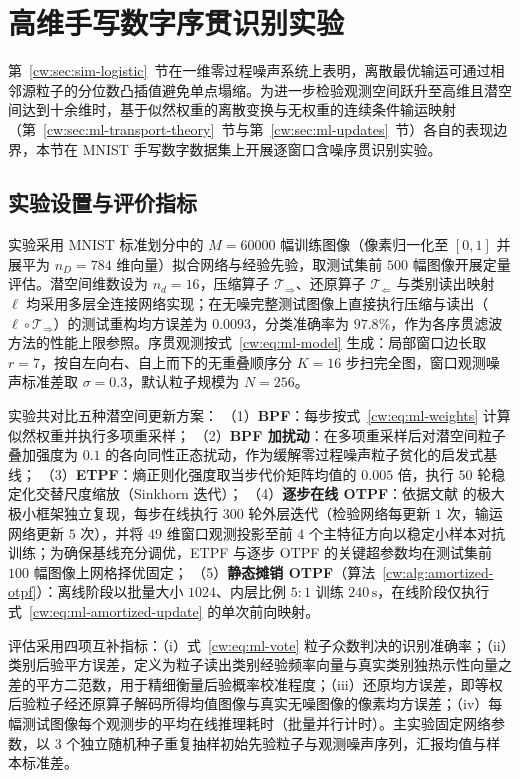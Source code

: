 \section{高维手写数字序贯识别实验}\label{cw:sec:ml-experiments}

第~\ref{cw:sec:sim-logistic}~节在一维零过程噪声系统上表明，离散最优输运可通过相邻源粒子的分位数凸插值避免单点塌缩。为进一步检验观测空间跃升至高维且潜空间达到十余维时，基于似然权重的离散变换与无权重的连续条件输运映射（第~\ref{cw:sec:ml-transport-theory}~节与第~\ref{cw:sec:ml-updates}~节）各自的表现边界，本节在 MNIST 手写数字数据集\cite{lecun1998gradient}上开展逐窗口含噪序贯识别实验。

\subsection{实验设置与评价指标}

实验采用 MNIST 标准划分中的 $M=60000$ 幅训练图像（像素归一化至 $[0,1]$ 并展平为 $n_D=784$ 维向量）拟合网络与经验先验，取测试集前 $500$ 幅图像开展定量评估。潜空间维数设为 $n_d=16$，压缩算子 $\mathscr T_{\Rightarrow}$、还原算子 $\mathscr T_{\Leftarrow}$ 与类别读出映射 $\ell$ 均采用多层全连接网络实现；在无噪完整测试图像上直接执行压缩与读出（$\ell\circ\mathscr T_{\Rightarrow}$）的测试重构均方误差为 $0.0093$，分类准确率为 $97.8\%$，作为各序贯滤波方法的性能上限参照。序贯观测按式~\eqref{cw:eq:ml-model} 生成：局部窗口边长取 $r=7$，按自左向右、自上而下的无重叠顺序分 $K=16$ 步扫完全图，窗口观测噪声标准差取 $\sigma=0.3$，默认粒子规模为 $N=256$。

实验共对比五种潜空间更新方案：
（1）\textbf{BPF}：每步按式~\eqref{cw:eq:ml-weights} 计算似然权重并执行多项重采样；
（2）\textbf{BPF 加扰动}：在多项重采样后对潜空间粒子叠加强度为 $0.1$ 的各向同性正态扰动，作为缓解零过程噪声粒子贫化的启发式基线；
（3）\textbf{ETPF}：熵正则化强度取当步代价矩阵均值的 $0.005$ 倍，执行 $50$ 轮稳定化交替尺度缩放（Sinkhorn 迭代）；
（4）\textbf{逐步在线 OTPF}：依据文献\cite{aljarrah2024brenier} 的极大极小框架独立复现，每步在线执行 $300$ 轮外层迭代（检验网络每更新 $1$ 次，输运网络更新 $5$ 次），并将 $49$ 维窗口观测投影至前 $4$ 个主特征方向以稳定小样本对抗训练；为确保基线充分调优，ETPF 与逐步 OTPF 的关键超参数均在测试集前 $100$ 幅图像上网格择优固定；
（5）\textbf{静态摊销 OTPF}（算法~\ref{cw:alg:amortized-otpf}）：离线阶段以批量大小 $1024$、内层比例 $5:1$ 训练 $240\,\mathrm{s}$，在线阶段仅执行式~\eqref{cw:eq:ml-amortized-update} 的单次前向映射。

评估采用四项互补指标：（i）式~\eqref{cw:eq:ml-vote} 粒子众数判决的识别准确率；（ii）类别后验平方误差，定义为粒子读出类别经验频率向量与真实类别独热示性向量之差的平方二范数，用于精细衡量后验概率校准程度；（iii）还原均方误差，即等权后验粒子经还原算子解码所得均值图像与真实无噪图像的像素均方误差；（iv）每幅测试图像每个观测步的平均在线推理耗时（批量并行计时）。主实验固定网络参数，以 $3$ 个独立随机种子重复抽样初始先验粒子与观测噪声序列，汇报均值与样本标准差。

